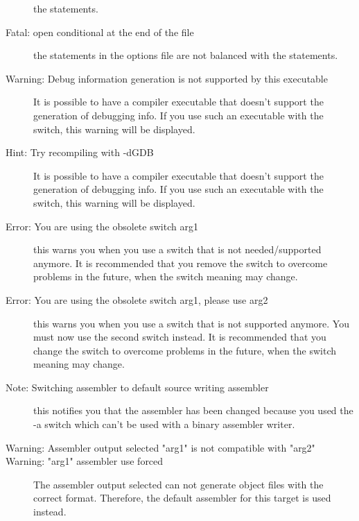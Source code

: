 \begin{description}
 the  statements.
\item [Fatal: open conditional at the end of the file]
 the  statements in the options file are not balanced with
 the  statements.
\item [Warning: Debug information generation is not supported by this executable]
 It is possible to have a compiler executable that doesn't support
 the generation of debugging info. If you use such an executable with the
  switch, this warning will be displayed.
\item [Hint: Try recompiling with -dGDB]
 It is possible to have a compiler executable that doesn't support
 the generation of debugging info. If you use such an executable with the
  switch, this warning will be displayed.
\item [Error: You are using the obsolete switch arg1]
 this warns you when you use a switch that is not needed/supported anymore.
 It is recommended that you remove the switch to overcome problems in the
 future, when the switch meaning may change.
\item [Error: You are using the obsolete switch arg1, please use arg2]
 this warns you when you use a switch that is not supported anymore. You
 must now use the second switch instead.
 It is recommended that you change the switch to overcome problems in the
 future, when the switch meaning may change.
\item [Note: Switching assembler to default source writing assembler]
 this notifies you that the assembler has been changed because you used the
 -a switch which can't be used with a binary assembler writer.
\item [Warning: Assembler output selected "arg1" is not compatible with "arg2"]
\item [Warning: "arg1" assembler use forced]
 The assembler output selected can not generate
 object files with the correct format. Therefore, the
 default assembler for this target is used instead.
\end{description}
